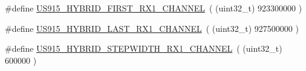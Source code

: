 \begin{DoxyCompactItemize}
\item 
\#define \mbox{\hyperlink{group___r_e_g_i_o_n_u_s915_h_y_b_ga28e4aa61b58960f8cf317c0d891204f8}{U\+S915\+\_\+\+H\+Y\+B\+R\+I\+D\+\_\+\+F\+I\+R\+S\+T\+\_\+\+R\+X1\+\_\+\+C\+H\+A\+N\+N\+EL}}~( (uint32\+\_\+t) 923300000 )
\item 
\#define \mbox{\hyperlink{group___r_e_g_i_o_n_u_s915_h_y_b_ga27ad9f504f6efe05c69bc1c41cf4ae28}{U\+S915\+\_\+\+H\+Y\+B\+R\+I\+D\+\_\+\+L\+A\+S\+T\+\_\+\+R\+X1\+\_\+\+C\+H\+A\+N\+N\+EL}}~( (uint32\+\_\+t) 927500000 )
\item 
\#define \mbox{\hyperlink{group___r_e_g_i_o_n_u_s915_h_y_b_ga1b77da2ffd6ac645137695b2bccdff08}{U\+S915\+\_\+\+H\+Y\+B\+R\+I\+D\+\_\+\+S\+T\+E\+P\+W\+I\+D\+T\+H\+\_\+\+R\+X1\+\_\+\+C\+H\+A\+N\+N\+EL}}~( (uint32\+\_\+t) 600000 )
\end{DoxyCompactItemize}
